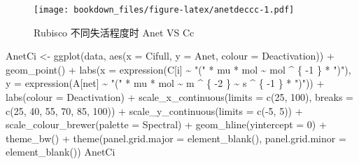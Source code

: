 \documentclass[
]{krantz}
\makeatletter
\newenvironment{Shaded}{\begin{snugshade}}{\end{snugshade}}
\newcommand{\AttributeTok}[1]{\textcolor[rgb]{0.77,0.63,0.00}{#1}}
\newcommand{\DecValTok}[1]{\textcolor[rgb]{0.00,0.00,0.81}{#1}}
\newcommand{\FunctionTok}[1]{\textcolor[rgb]{0.00,0.00,0.00}{#1}}
\newcommand{\NormalTok}[1]{#1}
\newcommand{\OtherTok}[1]{\textcolor[rgb]{0.56,0.35,0.01}{#1}}
\newcommand{\SpecialCharTok}[1]{\textcolor[rgb]{0.00,0.00,0.00}{#1}}
\newcommand{\StringTok}[1]{\textcolor[rgb]{0.31,0.60,0.02}{#1}}
\newenvironment{kframe}{%
\medskip{}
\setlength{\fboxsep}{.8em}
 \def\at@end@of@kframe{}%
 \ifinner\ifhmode%
  \def\at@end@of@kframe{\end{minipage}}%
  \begin{minipage}{\columnwidth}%
 \fi\fi%
 \def\FrameCommand##1{\hskip\@totalleftmargin \hskip-\fboxsep
 \colorbox{shadecolor}{##1}\hskip-\fboxsep
     \hskip-\linewidth \hskip-\@totalleftmargin \hskip\columnwidth}%
 \MakeFramed {\advance\hsize-\width
   \@totalleftmargin\z@ \linewidth\hsize
   \@setminipage}}%
 {\par\unskip\endMakeFramed%
 \at@end@of@kframe}
\renewenvironment{Shaded}{\begin{kframe}}{\end{kframe}}
\makeatother
\begin{document}
\begin{figure}
\centering
\texttt{[image: bookdown\_files/figure-latex/anetdeccc-1.pdf]}
\caption{\label{fig:anetdeccc}Rubisco 不同失活程度时 Anet VS Cc}
\end{figure}

\begin{Shaded}
\begin{Highlighting}[]
\NormalTok{AnetCi }\OtherTok{\textless{}{-}}
  \FunctionTok{ggplot}\NormalTok{(data, }\FunctionTok{aes}\NormalTok{(}\AttributeTok{x =}\NormalTok{ Cifull, }\AttributeTok{y =}\NormalTok{ Anet, }\AttributeTok{colour =}\NormalTok{ Deactivation)) }\SpecialCharTok{+}
  \FunctionTok{geom\_point}\NormalTok{() }\SpecialCharTok{+}
  \FunctionTok{labs}\NormalTok{(}\AttributeTok{x =} \FunctionTok{expression}\NormalTok{(C[i] }\SpecialCharTok{\textasciitilde{}} \StringTok{"("} \SpecialCharTok{*}\NormalTok{ mu }\SpecialCharTok{*}\NormalTok{ mol }\SpecialCharTok{\textasciitilde{}}\NormalTok{ mol }\SpecialCharTok{\^{}}\NormalTok{ \{}
    \SpecialCharTok{{-}}\DecValTok{1}
\NormalTok{  \} }\SpecialCharTok{*} \StringTok{")"}\NormalTok{),}
  \AttributeTok{y =} \FunctionTok{expression}\NormalTok{(A[net] }\SpecialCharTok{\textasciitilde{}} \StringTok{"("} \SpecialCharTok{*}\NormalTok{ mu }\SpecialCharTok{*}\NormalTok{ mol }\SpecialCharTok{\textasciitilde{}}\NormalTok{ m }\SpecialCharTok{\^{}}\NormalTok{ \{}
    \SpecialCharTok{{-}}\DecValTok{2}
\NormalTok{  \} }\SpecialCharTok{\textasciitilde{}}\NormalTok{ s }\SpecialCharTok{\^{}}\NormalTok{ \{}
    \SpecialCharTok{{-}}\DecValTok{1}
\NormalTok{  \} }\SpecialCharTok{*} \StringTok{")"}\NormalTok{)) }\SpecialCharTok{+}
  \FunctionTok{labs}\NormalTok{(}\AttributeTok{colour =} \StringTok{\textquotesingle{}Deactivation\textquotesingle{}}\NormalTok{) }\SpecialCharTok{+}
  \FunctionTok{scale\_x\_continuous}\NormalTok{(}\AttributeTok{limits =} \FunctionTok{c}\NormalTok{(}\DecValTok{25}\NormalTok{, }\DecValTok{100}\NormalTok{),}
                     \AttributeTok{breaks =} \FunctionTok{c}\NormalTok{(}\DecValTok{25}\NormalTok{, }\DecValTok{40}\NormalTok{, }\DecValTok{55}\NormalTok{, }\DecValTok{70}\NormalTok{, }\DecValTok{85}\NormalTok{, }\DecValTok{100}\NormalTok{)) }\SpecialCharTok{+}
  \FunctionTok{scale\_y\_continuous}\NormalTok{(}\AttributeTok{limits =} \FunctionTok{c}\NormalTok{(}\SpecialCharTok{{-}}\DecValTok{5}\NormalTok{, }\DecValTok{5}\NormalTok{)) }\SpecialCharTok{+}
  \FunctionTok{scale\_colour\_brewer}\NormalTok{(}\AttributeTok{palette =} \StringTok{\textquotesingle{}Spectral\textquotesingle{}}\NormalTok{) }\SpecialCharTok{+}
  \FunctionTok{geom\_hline}\NormalTok{(}\AttributeTok{yintercept =} \DecValTok{0}\NormalTok{) }\SpecialCharTok{+}
  \FunctionTok{theme\_bw}\NormalTok{() }\SpecialCharTok{+}
  \FunctionTok{theme}\NormalTok{(}\AttributeTok{panel.grid.major =} \FunctionTok{element\_blank}\NormalTok{(),}
        \AttributeTok{panel.grid.minor =} \FunctionTok{element\_blank}\NormalTok{())}
\NormalTok{AnetCi}
\end{Highlighting}
\end{Shaded}
\end{document}
